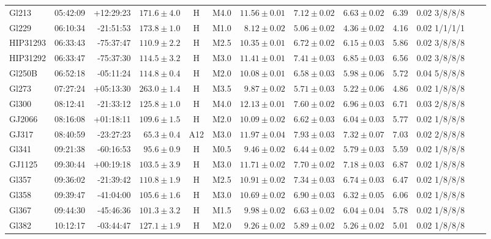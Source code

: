 \documentclass[referee]{aa}
\begin{document}
\begin{table}[h!]
{\begin{tabular}{ l r r r c c r r r r r r r}
Gl213 & 05:42:09 & +12:29:23 & $171.6 \pm  4.0$ & H & M4.0 &  $11.56 \pm 0.01$ & $7.12 \pm 0.02$ & $6.63 \pm 0.02$ & 6.39 & 0.02 3/8/8/8 \\
Gl229 & 06:10:34 & -21:51:53 & $173.8 \pm  1.0$ & H & M1.0 &  $8.12 \pm 0.02$ & $5.06 \pm 0.02$ & $4.36 \pm 0.02$ & 4.16 & 0.02 1/1/1/1 \\
HIP31293 & 06:33:43 & -75:37:47 & $110.9 \pm  2.2$ & H & M2.5 &  $10.35 \pm 0.01$ & $6.72 \pm 0.02$ & $6.15 \pm 0.03$ & 5.86 & 0.02 3/8/8/8 \\
HIP31292 & 06:33:47 & -75:37:30 & $114.5 \pm  3.2$ & H & M3.0 &  $11.41 \pm 0.01$ & $7.41 \pm 0.03$ & $6.85 \pm 0.03$ & 6.56 & 0.02 3/8/8/8 \\
Gl250B & 06:52:18 & -05:11:24 & $114.8 \pm  0.4$ & H & M2.0 &  $10.08 \pm 0.01$ & $6.58 \pm 0.03$ & $5.98 \pm 0.06$ & 5.72 & 0.04 5/8/8/8 \\
Gl273 & 07:27:24 & +05:13:30 & $263.0 \pm  1.4$ & H & M3.5 &  $9.87 \pm 0.02$ & $5.71 \pm 0.03$ & $5.22 \pm 0.06$ & 4.86 & 0.02 1/8/8/8 \\
Gl300 & 08:12:41 & -21:33:12 & $125.8 \pm  1.0$ & H & M4.0 &  $12.13 \pm 0.01$ & $7.60 \pm 0.02$ & $6.96 \pm 0.03$ & 6.71 & 0.03 2/8/8/8 \\
GJ2066 & 08:16:08 & +01:18:11 & $109.6 \pm  1.5$ & H & M2.0 &  $10.09 \pm 0.02$ & $6.62 \pm 0.03$ & $6.04 \pm 0.03$ & 5.77 & 0.02 1/8/8/8 \\
GJ317 & 08:40:59 & -23:27:23 & $65.3 \pm  0.4$ & A12 & M3.0 &  $11.97 \pm 0.04$ & $7.93 \pm 0.03$ & $7.32 \pm 0.07$ & 7.03 & 0.02 2/8/8/8 \\
Gl341 & 09:21:38 & -60:16:53 & $95.6 \pm  0.9$ & H & M0.5 &  $9.46 \pm 0.02$ & $6.44 \pm 0.02$ & $5.79 \pm 0.03$ & 5.59 & 0.02 1/8/8/8 \\
GJ1125 & 09:30:44 & +00:19:18 & $103.5 \pm  3.9$ & H & M3.0 &  $11.71 \pm 0.02$ & $7.70 \pm 0.02$ & $7.18 \pm 0.03$ & 6.87 & 0.02 1/8/8/8 \\
Gl357 & 09:36:02 & -21:39:42 & $110.8 \pm  1.9$ & H & M2.5 &  $10.91 \pm 0.02$ & $7.34 \pm 0.03$ & $6.74 \pm 0.03$ & 6.47 & 0.02 1/8/8/8 \\
Gl358 & 09:39:47 & -41:04:00 & $105.6 \pm  1.6$ & H & M3.0 &  $10.69 \pm 0.02$ & $6.90 \pm 0.03$ & $6.32 \pm 0.05$ & 6.06 & 0.02 1/8/8/8 \\
Gl367 & 09:44:30 & -45:46:36 & $101.3 \pm  3.2$ & H & M1.5 &  $9.98 \pm 0.02$ & $6.63 \pm 0.02$ & $6.04 \pm 0.04$ & 5.78 & 0.02 1/8/8/8 \\
Gl382 & 10:12:17 & -03:44:47 & $127.1 \pm  1.9$ & H & M2.0 &  $9.26 \pm 0.02$ & $5.89 \pm 0.02$ & $5.26 \pm 0.02$ & 5.01 & 0.02 1/8/8/8 \\

\end{tabular}}
\end{table}
\end{document}
